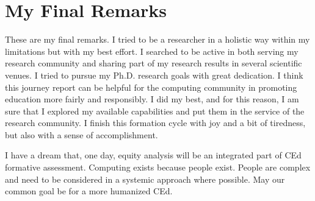  \section{My Final Remarks}
 \label{conclusions-sec:my-final-remarks}

 These are my final remarks. I tried to be a researcher in a holistic way within my limitations but with my best effort. I searched to be active in both serving my research community and sharing part of my research results in several scientific venues. I tried to pursue my \gls{Ph.D.} research goals with great dedication. I think this journey report can be helpful for the computing community in promoting education more fairly and responsibly. I did my best, and for this reason, I am sure that I explored my available capabilities and put them in the service of the research community. I finish this formation cycle with joy and a bit of tiredness, but also with a sense of accomplishment.

  I have a dream that, one day, equity analysis will be an integrated part of \gls{CEd} formative assessment. Computing exists because people exist. People are complex and need to be considered in a systemic approach where possible. May our common goal be for a more humanized \gls{CEd}.


